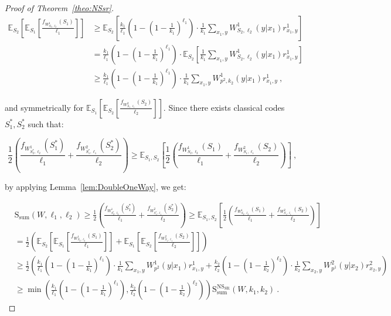 \documentclass[11pt]{article}
\theoremstyle{definition}
\theoremstyle{remark}
\begin{document}
\begin{proof}[Proof of Theorem~\ref{theo:NSsr}]
  \begin{equation}
    \begin{aligned}
      \mathbb{E}_{S_2}\left[\mathbb{E}_{S_1}\left[ \frac{f_{W^1_{S_2,\ell_2}}(S_1)}{\ell_1}\right]\right] &\geq  \mathbb{E}_{S_2}\left[\frac{k_1}{\ell_1}\left(1-\left(1-\frac{1}{k_1}\right)^{\ell_1}\right) \cdot \frac{1}{k_1}\sum_{x_1,y} W^1_{S_2,\ell_2}(y|x_1)r^1_{x_1,y}\right]\\
      &=\frac{k_1}{\ell_1}\left(1-\left(1-\frac{1}{k_1}\right)^{\ell_1}\right) \cdot \mathbb{E}_{S_2}\left[\frac{1}{k_1}\sum_{x_1,y} W^1_{S_2,\ell_2}(y|x_1)r^1_{x_1,y}\right]\\
      &\geq \frac{k_1}{\ell_1}\left(1-\left(1-\frac{1}{k_1}\right)^{\ell_1}\right) \cdot \frac{1}{k_1}\sum_{x_1,y} W^1_{p^2,k_2}(y|x_1)r^1_{x_1,y} \ ,
    \end{aligned}
  \end{equation}

  and symmetrically for $\mathbb{E}_{S_1}\left[\mathbb{E}_{S_2}\left[ \frac{f_{W^2_{S_1,\ell_1}}(S_2)}{\ell_2}\right]\right]$. Since there exists classical codes $S_1^*,S_2^*$ such that:

  \[ \frac{1}{2}\left(\frac{f_{W^1_{S_2^*,\ell_2}}(S_1^*)}{\ell_1} + \frac{f_{W^2_{S_1^*,\ell_1}}(S_2^*)}{\ell_2}\right) \geq \mathbb{E}_{S_1,S_2}\left[\frac{1}{2}\left(\frac{f_{W^1_{S_2,\ell_2}}(S_1)}{\ell_1} + \frac{f_{W^2_{S_1,\ell_1}}(S_2)}{\ell_2}\right)\right]\ , \]
  
  by applying Lemma~\ref{lem:DoubleOneWay}, we get:
  
  \begin{equation}
    \begin{aligned}
      &\mathrm{S}_{\text{sum}}(W,\ell_1,\ell_2) \geq \frac{1}{2}\left(\frac{f_{W^1_{S_2^*,\ell_2}}(S_1^*)}{\ell_1} + \frac{f_{W^2_{S_1^*,\ell_1}}(S_2^*)}{\ell_2}\right) \geq  \mathbb{E}_{S_1,S_2}\left[\frac{1}{2}\left(\frac{f_{W^1_{S_2,\ell_2}}(S_1)}{\ell_1} + \frac{f_{W^2_{S_1,\ell_1}}(S_2)}{\ell_2}\right)\right]\\
      &= \frac{1}{2} \left(\mathbb{E}_{S_2}\left[\mathbb{E}_{S_1}\left[ \frac{f_{W^1_{S_2,\ell_2}}(S_1)}{\ell_1}\right]\right] + \mathbb{E}_{S_1}\left[\mathbb{E}_{S_2}\left[ \frac{f_{W^2_{S_1,\ell_1}}(S_2)}{\ell_2}\right]\right]\right)\\
      &\geq \frac{1}{2}\left(\frac{k_1}{\ell_1}\left(1-\left(1-\frac{1}{k_1}\right)^{\ell_1}\right) \cdot \frac{1}{k_1}\sum_{x_1,y} W^1_{p^2}(y|x_1)r^1_{x_1,y} + \frac{k_2}{\ell_2}\left(1-\left(1-\frac{1}{k_2}\right)^{\ell_2}\right) \cdot \frac{1}{k_2}\sum_{x_2,y}W^2_{p^1}(y|x_2)r^2_{x_2,y} \right)\\
      &\geq  \min\left(\frac{k_1}{\ell_1}\left(1-\left(1-\frac{1}{k_1}\right)^{\ell_1}\right),\frac{k_2}{\ell_2}\left(1-\left(1-\frac{1}{k_2}\right)^{\ell_2}\right)\right)\mathrm{S}_{\text{sum}}^{\mathrm{NS}_{\mathrm{SR}}}(W,k_1,k_2) \ .
    \end{aligned}
  \end{equation}
\end{proof}
\end{document}
